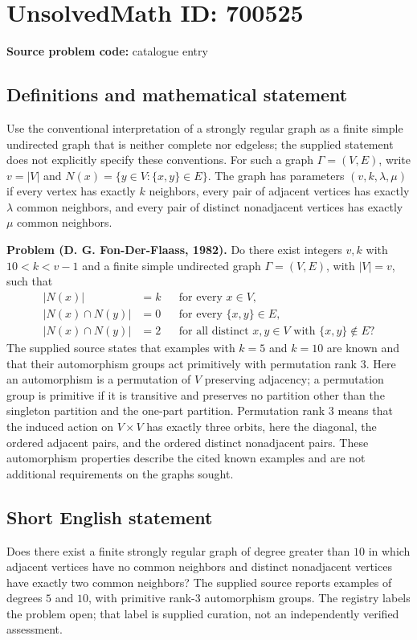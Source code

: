 \documentclass[11pt]{article}
\begin{document}
\section*{UnsolvedMath ID: 700525}
\textbf{Source problem code:} catalogue entry
\subsection{Definitions and mathematical statement}
Use the conventional interpretation of a strongly regular graph as a finite simple undirected graph that is neither complete nor edgeless; the supplied statement does not explicitly specify these conventions. For such a graph \(\Gamma=(V,E)\), write \(v=|V|\) and \(N(x)=\{y\in V:\{x,y\}\in E\}\). The graph has parameters \((v,k,\lambda,\mu)\) if every vertex has exactly \(k\) neighbors, every pair of adjacent vertices has exactly \(\lambda\) common neighbors, and every pair of distinct nonadjacent vertices has exactly \(\mu\) common neighbors.

\textbf{Problem (D. G. Fon-Der-Flaass, 1982).} Do there exist integers \(v,k\) with \(10<k<v-1\) and a finite simple undirected graph \(\Gamma=(V,E)\), with \(|V|=v\), such that
\[
\begin{aligned}
|N(x)|&=k &&\text{for every }x\in V,\\
|N(x)\cap N(y)|&=0 &&\text{for every }\{x,y\}\in E,\\
|N(x)\cap N(y)|&=2 &&\text{for all distinct }x,y\in V\text{ with }\{x,y\}\notin E?
\end{aligned}
\]
The supplied source states that examples with \(k=5\) and \(k=10\) are known and that their automorphism groups act primitively with permutation rank \(3\). Here an automorphism is a permutation of \(V\) preserving adjacency; a permutation group is primitive if it is transitive and preserves no partition other than the singleton partition and the one-part partition. Permutation rank \(3\) means that the induced action on \(V\times V\) has exactly three orbits, here the diagonal, the ordered adjacent pairs, and the ordered distinct nonadjacent pairs. These automorphism properties describe the cited known examples and are not additional requirements on the graphs sought.
\subsection{Short English statement}
Does there exist a finite strongly regular graph of degree greater than \(10\) in which adjacent vertices have no common neighbors and distinct nonadjacent vertices have exactly two common neighbors? The supplied source reports examples of degrees \(5\) and \(10\), with primitive rank-\(3\) automorphism groups. The registry labels the problem open; that label is supplied curation, not an independently verified assessment.
\end{document}

